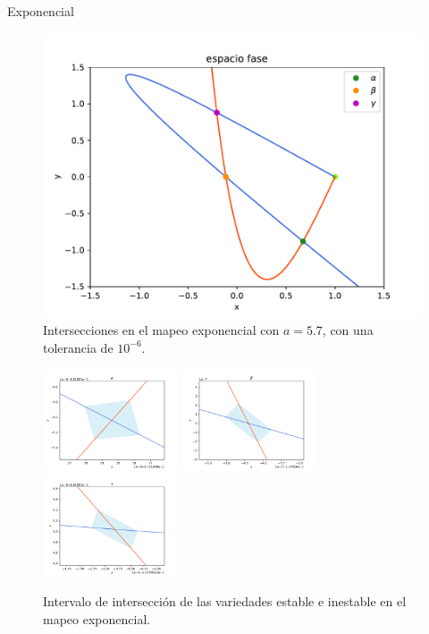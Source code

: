 \documentclass[11pt]{beamer}
\theoremstyle{definition}
\begin{document}
\begin{frame}{Exponencial}
\begin{figure}[H]
\centering
\includegraphics[scale=0.5]{cruces_jung1}
\caption{Intersecciones en el mapeo exponencial con $a=5.7$, con una tolerancia de $10^{-6}$.}
\label{jung_cortes}
\end{figure}
\end{frame}

\begin{frame}
\begin{figure}
\includegraphics[width=40mm]{cruce_a}
\includegraphics[width=40mm]{cruce_b}
\includegraphics[width=40mm]{cruce_c}
\caption{Intervalo de intersección de las variedades estable e inestable en el mapeo exponencial.} 
\label{cruces_jung}
\end{figure}
\end{frame}
\end{document}
